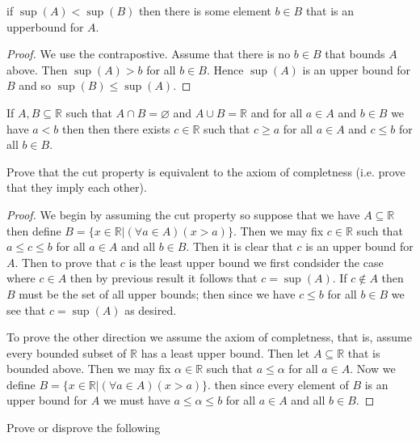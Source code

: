 \documentclass[11pt,largemargins]{homework}
\newcommand{\R}{\mathbb{R}}
\begin{document}
\question
    if $\sup(A) < \sup(B)$ then there is some element $b \in B$ that is an upperbound for $A$.

    \begin{proof}
        We use the contrapostive. Assume that there is no $b \in B$ that bounds $A$ above. Then $\sup(A) > b$ for all $b \in B$. Hence $\sup(A)$ is an upper bound for $B$ and so 
        $\sup(B) \leq \sup(A)$. 
    \end{proof}


\question

\begin{definition}
    If $A, B \subseteq \R$ such that $A \cap B = \varnothing$ and $A \cup B = \R$ and for all $a \in A $ and $b \in B$ we have $a < b$ then then there exists $c \in \R$ such that 
    $c \geq a$ for all $a \in A$ and $c \leq b$ for all $b \in B$. 
\end{definition}

Prove that the cut property is equivalent to the axiom of completness (i.e. prove that they imply each other).

\begin{proof}
    We begin by assuming the cut property so suppose that we have $A \subseteq \R$ then define $B = \{x \in \R | (\forall a \in A)(x > a) \}$. Then we may fix $c \in \R$ such that $a \leq c \leq b$ for all $a \in A$ and all $b \in B$. 
    Then it is clear that $c$ is an upper bound for $A$. Then to prove that $c$ is the least upper bound we first condsider the case where $c \in A$ then by previous result it follows that $c = \sup(A)$. If $c \notin A$ then $B$ must be the set of all upper bounds; then since
    we have $c \leq b$ for all $b \in B$ we see that $c = \sup(A)$ as desired. 

    To prove the other direction we assume the axiom of completness, that is, assume every bounded subset of $\R$ has a least upper bound. Then let $A \subseteq \R$ that is bounded above. Then we may fix $\alpha \in \R$ such that $a \leq \alpha$ for all $a \in A$. Now we define  $B = \{x \in \R | (\forall a \in A)(x > a) \}$. 
    then since every element of $B$ is an upper bound for $A$ we must have $a \leq \alpha \leq b$ for all $a \in A$ and all $b \in B$. 
\end{proof}


\question
Prove or disprove the following 
\end{document}
